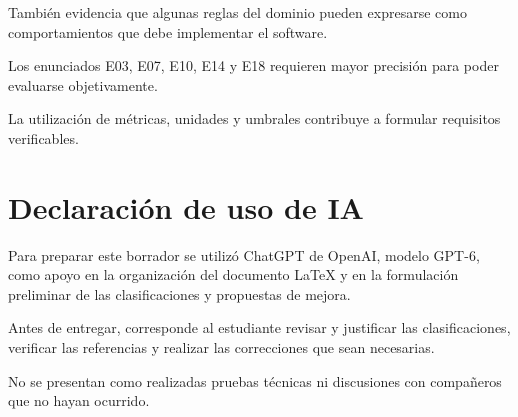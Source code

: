 \documentclass[12pt,a4paper]{article}
\begin{document}
También evidencia que algunas reglas
del dominio pueden expresarse como
comportamientos que debe implementar
el software.

Los enunciados E03, E07, E10, E14 y E18
requieren mayor precisión para poder
evaluarse objetivamente.

La utilización de métricas, unidades
y umbrales contribuye a formular
requisitos verificables.

\section{Declaración de uso de IA}

Para preparar este borrador se utilizó
ChatGPT de OpenAI, modelo GPT-6,
como apoyo en la organización
del documento LaTeX y en la
formulación preliminar de las
clasificaciones y propuestas de mejora.

Antes de entregar, corresponde al
estudiante revisar y justificar
las clasificaciones, verificar las
referencias y realizar las
correcciones que sean necesarias.

No se presentan como realizadas
pruebas técnicas ni discusiones
con compañeros que no hayan ocurrido.

\printbibliography[
heading=bibintoc,
title={Referencias bibliográficas}
]
\end{document}
